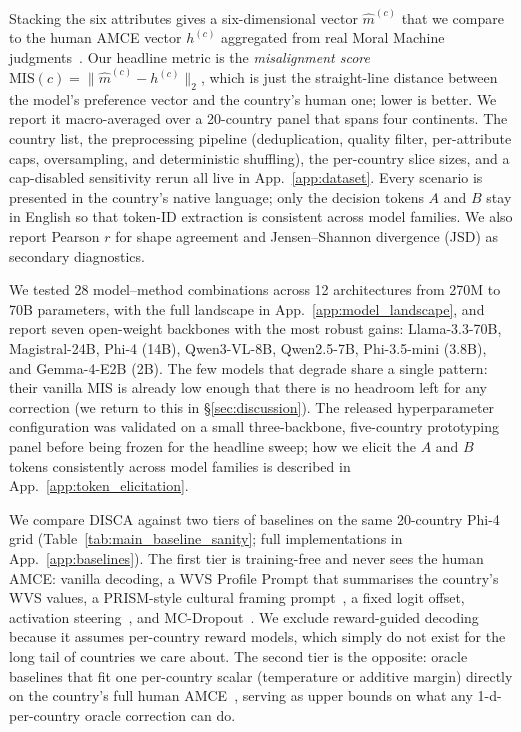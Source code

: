 \documentclass{article}
\begin{document}
Stacking the six attributes gives a six-dimensional vector $\hat{m}^{(c)}$ that we compare to the human AMCE vector $h^{(c)}$ aggregated from real Moral Machine judgments~\citep{awad2018moral, jin2025multitp}. Our headline metric is the \emph{misalignment score} $\mathrm{MIS}(c) = \|\hat{m}^{(c)} - h^{(c)}\|_2$, which is just the straight-line distance between the model's preference vector and the country's human one; lower is better. We report it macro-averaged over a 20-country panel that spans four continents. The country list, the preprocessing pipeline (deduplication, quality filter, per-attribute caps, oversampling, and deterministic shuffling), the per-country slice sizes, and a cap-disabled sensitivity rerun all live in App.~\ref{app:dataset}. Every scenario is presented in the country's native language; only the decision tokens $A$ and $B$ stay in English so that token-ID extraction is consistent across model families. We also report Pearson $r$ for shape agreement and Jensen--Shannon divergence (JSD) as secondary diagnostics.

We tested 28 model--method combinations across 12 architectures from 270M to 70B parameters, with the full landscape in App.~\ref{app:model_landscape}, and report seven open-weight backbones with the most robust gains: Llama-3.3-70B, Magistral-24B, Phi-4 (14B), Qwen3-VL-8B, Qwen2.5-7B, Phi-3.5-mini (3.8B), and Gemma-4-E2B (2B). The few models that degrade share a single pattern: their vanilla MIS is already low enough that there is no headroom left for any correction (we return to this in \S\ref{sec:discussion}). The released hyperparameter configuration was validated on a small three-backbone, five-country prototyping panel before being frozen for the headline sweep; how we elicit the $A$ and $B$ tokens consistently across model families is described in App.~\ref{app:token_elicitation}.

We compare DISCA against two tiers of baselines on the same 20-country Phi-4 grid (Table~\ref{tab:main_baseline_sanity}; full implementations in App.~\ref{app:baselines}). The first tier is training-free and never sees the human AMCE: vanilla decoding, a WVS Profile Prompt that summarises the country's WVS values, a PRISM-style cultural framing prompt~\citep{kirk2024prism}, a fixed logit offset, activation steering~\citep{arditi2025refusal, zou2023representation}, and MC-Dropout~\citep{gal2016dropout, kwon2025dropouts}. We exclude reward-guided decoding~\citep{khanov2024args, mudgal2024controlled} because it assumes per-country reward models, which simply do not exist for the long tail of countries we care about. The second tier is the opposite: oracle baselines that fit one per-country scalar (temperature or additive margin) directly on the country's full human AMCE~\citep{guo2017calibration}, serving as upper bounds on what any 1-d-per-country oracle correction can do.
\end{document}
